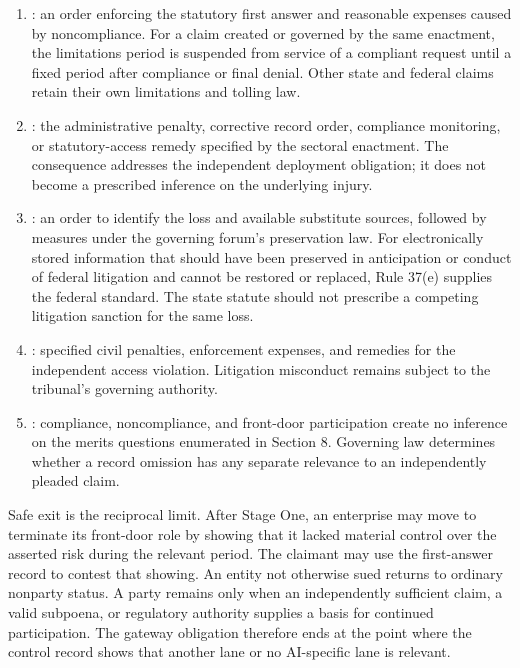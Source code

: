 \begin{enumerate}[leftmargin=2.2em]
\item {}: an order enforcing the statutory first answer and reasonable expenses caused by noncompliance. For a claim created or governed by the same enactment, the limitations period is suspended from service of a compliant request until a fixed period after compliance or final denial. Other state and federal claims retain their own limitations and tolling law.
\item {}: the administrative penalty, corrective record order, compliance monitoring, or statutory-access remedy specified by the sectoral enactment. The consequence addresses the independent deployment obligation; it does not become a prescribed inference on the underlying injury.
\item {}: an order to identify the loss and available substitute sources, followed by measures under the governing forum's preservation law. For electronically stored information that should have been preserved in anticipation or conduct of federal litigation and cannot be restored or replaced, Rule 37(e) supplies the federal standard. The state statute should not prescribe a competing litigation sanction for the same loss.
\item {}: specified civil penalties, enforcement expenses, and remedies for the independent access violation. Litigation misconduct remains subject to the tribunal's governing authority.
\item {}: compliance, noncompliance, and front-door participation create no inference on the merits questions enumerated in Section 8. Governing law determines whether a record omission has any separate relevance to an independently pleaded claim.
\end{enumerate}

Safe exit is the reciprocal limit. After Stage One, an enterprise may move to terminate its front-door role by showing that it lacked material control over the asserted risk during the relevant period. The claimant may use the first-answer record to contest that showing. An entity not otherwise sued returns to ordinary nonparty status. A party remains only when an independently sufficient claim, a valid subpoena, or regulatory authority supplies a basis for continued participation. The gateway obligation therefore ends at the point where the control record shows that another lane or no AI-specific lane is relevant.

